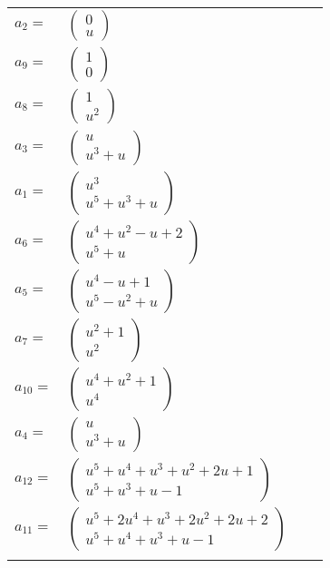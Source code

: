 \documentclass[1p]{elsarticle_modified}
\theoremstyle{definition}
\begin{document}
\begin{tabular}{m{7pt} m{180pt} m{7pt} m{180pt} }
\flushright $a_{2}=$&$\begin{pmatrix}0\\u\end{pmatrix}$ \\
\flushright $a_{9}=$&$\begin{pmatrix}1\\0\end{pmatrix}$ \\
\flushright $a_{8}=$&$\begin{pmatrix}1\\u^2\end{pmatrix}$ \\
\flushright $a_{3}=$&$\begin{pmatrix}u\\u^3+u\end{pmatrix}$ \\
\flushright $a_{1}=$&$\begin{pmatrix}u^3\\u^5+u^3+u\end{pmatrix}$ \\
\flushright $a_{6}=$&$\begin{pmatrix}u^4+u^2- u+2\\u^5+u\end{pmatrix}$ \\
\flushright $a_{5}=$&$\begin{pmatrix}u^4- u+1\\u^5- u^2+u\end{pmatrix}$ \\
\flushright $a_{7}=$&$\begin{pmatrix}u^2+1\\u^2\end{pmatrix}$ \\
\flushright $a_{10}=$&$\begin{pmatrix}u^4+u^2+1\\u^4\end{pmatrix}$ \\
\flushright $a_{4}=$&$\begin{pmatrix}u\\u^3+u\end{pmatrix}$ \\
\flushright $a_{12}=$&$\begin{pmatrix}u^5+u^4+u^3+u^2+2 u+1\\u^5+u^3+u-1\end{pmatrix}$ \\
\flushright $a_{11}=$&$\begin{pmatrix}u^5+2 u^4+u^3+2 u^2+2 u+2\\u^5+u^4+u^3+u-1\end{pmatrix}$\\&\end{tabular}
\end{document}
